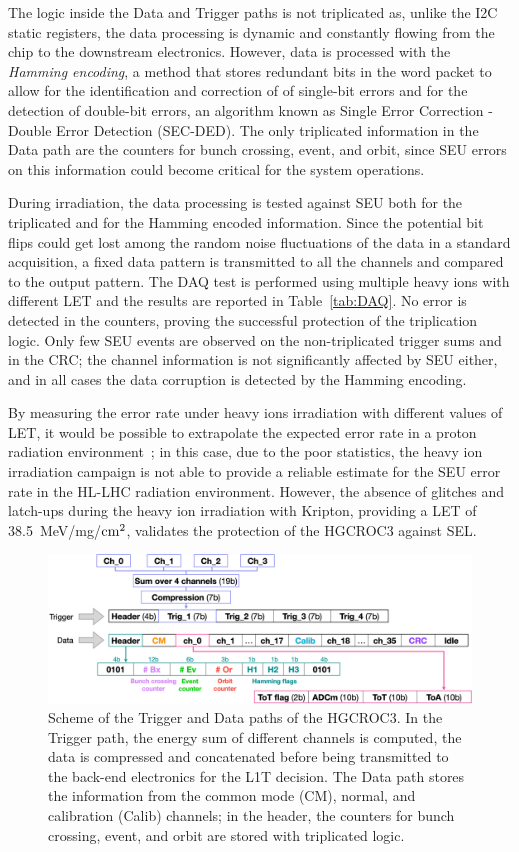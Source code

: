 The logic inside the Data and Trigger paths is not triplicated as, unlike the I2C static registers, the data processing is dynamic and constantly flowing from the chip to the downstream electronics. However, data is processed with the \textit{Hamming encoding}, a method that stores redundant bits in the word packet to allow for the identification and correction of of single-bit errors and for the detection of double-bit errors, an algorithm known as Single Error Correction - Double Error Detection (SEC-DED). The only triplicated information in the Data path are the counters for bunch crossing, event, and orbit, since SEU errors on this information could become critical for the system operations. 

During irradiation, the data processing is tested against SEU both for the triplicated and for the Hamming encoded information.
Since the potential bit flips could get lost among the random noise fluctuations of the data in a standard acquisition, a fixed data pattern is transmitted to all the channels and compared to the output pattern.
The DAQ test is performed using multiple heavy ions with different LET and the results are reported in Table~\ref{tab:DAQ}. No error is detected in the counters, proving the successful protection of the triplication logic.
Only few SEU events are observed on the non-triplicated trigger sums and in the CRC; the channel information is not significantly affected by SEU either, and in all cases the data corruption is detected by the Hamming encoding. 

By measuring the error rate under heavy ions irradiation with different values of LET, it would be possible to extrapolate the expected error rate in a proton radiation environment~\cite{federico}; in this case, due to the poor statistics, the heavy ion irradiation campaign is not able to provide a reliable estimate for the SEU error rate in the HL-LHC radiation environment.
However, the absence of glitches and latch-ups during the heavy ion irradiation with Kripton, providing a LET of 38.5~MeV/mg/$\textnormal{cm}^2$, validates the protection of the HGCROC3 against SEL.

\begin{figure}
    \centering
    \includegraphics[width=0.95\linewidth]{Figures/HGCAL/TriggerDataPath.pdf}
    \caption{Scheme of the Trigger and Data paths of the HGCROC3. In the Trigger path, the energy sum of different channels is computed, the data is compressed and concatenated before being transmitted to the back-end electronics for the L1T decision. The Data path stores the information from the common mode (CM), normal, and calibration (Calib) channels; in the header, the counters for bunch crossing, event, and orbit are stored with triplicated logic.}
    \label{fig:TriggerDataPath}
\end{figure}

